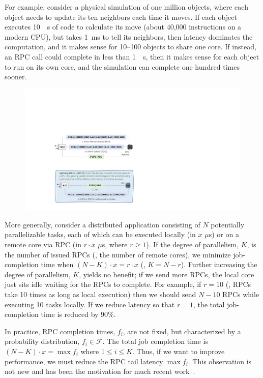 For example, consider a physical simulation of one million objects, where each object needs to update its ten neighbors each time it moves. 
If each object executes \SI{10}{\mu s} of code to calculate its move (about 40,000 instructions on a modern CPU), but takes \SI{1}{ms} to tell its neighbors, then latency dominates the computation, and it makes sense for 10--100 objects to share one core. 
If instead, an RPC call could complete in less than \SI{1}{\mu s}, then it makes sense for each object to run on its own core, and the simulation can complete one hundred times sooner. 

\begin{figure}[t]
  \includegraphics[width=\linewidth]{./figures/lnic-fbox}
  \label{fig:lnic-fbox}
\end{figure}

More generally, consider a distributed application consisting of $N$ potentially parallelizable tasks, each of which can be executed locally (in $x$ $\mu$s) or on a remote core via RPC (in $r \cdot x$ $\mu$s, where $r \ge 1$). 
If the degree of parallelism, $K$, is the number of issued RPCs (\ie, the number of remote cores), we minimize job-completion time when $(N - K)\cdot x = r \cdot x$ (\ie, $K = N - r$). 
Further increasing the degree of parallelism, $K$, yields no benefit; if we send more RPCs, the local core just sits idle waiting for the RPCs to complete. 
For example, if $r = 10$ (\ie, RPCs take 10 times as long as local execution) then we should send $N-10$ RPCs while executing 10 tasks locally. 
If we reduce latency so that $r=1$, the total job-completion time is reduced by 90\%.  

In practice, RPC completion times, $f_i$, are not fixed, but characterized by a probability distribution, $f_i \in \mathcal{F}$. 
The total job completion time is $(N - K) \cdot x =\max{f_i}$ where $1\le i \le K$. Thus, if we want to improve performance, we must reduce the RPC tail latency $\max{f_i}$. 
This observation is not new and has been the motivation for much recent work~\cite{shinjuku, shenango, rpcvalet}. 

